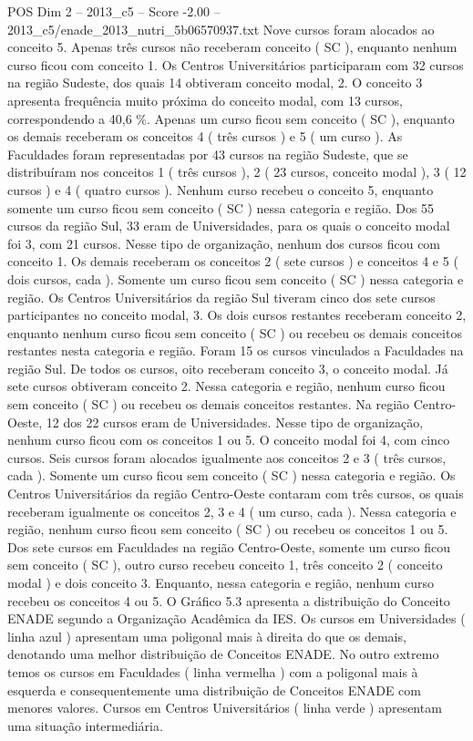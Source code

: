\begin{textsample}{POS Dim 2 – 2013\_c5 – Score -2.00 – 2013\_c5/enade\_2013\_nutri\_5b06570937.txt}
Nove cursos foram alocados ao conceito 5.
Apenas três cursos não receberam conceito ( SC ), enquanto nenhum curso ficou com conceito 1.
Os Centros Universitários participaram com 32 cursos na região Sudeste, dos quais 14 obtiveram conceito modal, 2.
O conceito 3 apresenta frequência muito próxima do conceito modal, com 13 cursos, correspondendo a 40,6 \%.
Apenas um curso ficou sem conceito ( SC ), enquanto os demais receberam os conceitos 4 ( três cursos ) e 5 ( um curso ).
As Faculdades foram representadas por 43 cursos na região Sudeste, que se distribuíram nos conceitos 1 ( três cursos ), 2 ( 23 cursos, conceito modal ), 3 ( 12 cursos ) e 4 ( quatro cursos ).
Nenhum curso recebeu o conceito 5, enquanto somente um curso ficou sem conceito ( SC ) nessa categoria e região.
Dos 55 cursos da região Sul, 33 eram de Universidades, para os quais o conceito modal foi 3, com 21 cursos.
Nesse tipo de organização, nenhum dos cursos ficou com conceito 1.
Os demais receberam os conceitos 2 ( sete cursos ) e conceitos 4 e 5 ( dois cursos, cada ).
Somente um curso ficou sem conceito ( SC ) nessa categoria e região.
Os Centros Universitários da região Sul tiveram cinco dos sete cursos participantes no conceito modal, 3.
Os dois cursos restantes receberam conceito 2, enquanto nenhum curso ficou sem conceito ( SC ) ou recebeu os demais conceitos restantes nesta categoria e região.
Foram 15 os cursos vinculados a Faculdades na região Sul.
De todos os cursos, oito receberam conceito 3, o conceito modal.
Já sete cursos obtiveram conceito 2.
Nessa categoria e região, nenhum curso ficou sem conceito ( SC ) ou recebeu os demais conceitos restantes.
Na região Centro-Oeste, 12 dos 22 cursos eram de Universidades.
Nesse tipo de organização, nenhum curso ficou com os conceitos 1 ou 5.
O conceito modal foi 4, com cinco cursos.
Seis cursos foram alocados igualmente aos conceitos 2 e 3 ( três cursos, cada ).
Somente um curso ficou sem conceito ( SC ) nessa categoria e região.
Os Centros Universitários da região Centro-Oeste contaram com três cursos, os quais receberam igualmente os conceitos 2, 3 e 4 ( um curso, cada ).
Nessa categoria e região, nenhum curso ficou sem conceito ( SC ) ou recebeu os conceitos 1 ou 5.
Dos sete cursos em Faculdades na região Centro-Oeste, somente um curso ficou sem conceito ( SC ), outro curso recebeu conceito 1, três conceito 2 ( conceito modal ) e dois conceito 3.
Enquanto, nessa categoria e região, nenhum curso recebeu os conceitos 4 ou 5.
O Gráfico 5.3 apresenta a distribuição do Conceito ENADE segundo a Organização Acadêmica da IES.
Os cursos em Universidades ( linha azul ) apresentam uma poligonal mais à direita do que os demais, denotando uma melhor distribuição de Conceitos ENADE.
No outro extremo temos os cursos em Faculdades ( linha vermelha ) com a poligonal mais à esquerda e consequentemente uma distribuição de Conceitos ENADE com menores valores.
Cursos em Centros Universitários ( linha verde ) apresentam uma situação intermediária.

\end{textsample}

